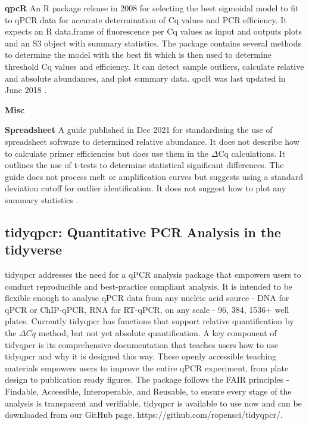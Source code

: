 \documentclass{SBCbookchapter}
\begin{document}
\textbf{qpcR} An R package release in 2008 for selecting the best sigmoidal model to fit to qPCR data for accurate determination of Cq values and PCR efficiency. It expects an R data.frame of fluorescence per Cq values as input and outputs plots and an S3 object with summary statistics. The package contains several methods to determine the model with the best fit which is then used to determine threshold Cq values and efficiency. It can detect sample outliers, calculate relative and absolute abundances, and plot summary data. qpcR was last updated in June 2018 \cite{Ritz2008}.

\textbf{Misc}

\textbf{Spreadsheet} A guide published in Dec 2021 for standardising the use of spreadsheet software to determined relative abundance. It does not describe how to calculate primer efficiencies but does use them in the $\Delta$Cq calculations. It outlines the use of t-tests to determine statistical significant differences.  The guide does not process melt or amplification curves but suggests using a standard deviation cutoff for outlier identification. It does not suggest how to plot any summary statistics \cite{Ng2021}.



\subsection{tidyqpcr: Quantitative PCR Analysis in the tidyverse}

tidyqpcr addresses the need for a qPCR analysis package that empowers users to conduct reproducible and best-practice compliant analysis.
It is intended to be flexible enough to analyse qPCR data from any nucleic acid source - DNA for qPCR or ChIP-qPCR, RNA for RT-qPCR, on any scale - 96, 384, 1536+ well plates.
Currently tidyqpcr has functions that support relative quantification by the $\Delta Cq$ method, but not yet absolute quantification.
A key component of tidyqpcr is its comprehensive documentation that teaches users how to use tidyqpcr and why it is designed this way.
These openly accessible teaching materials empowers users to improve the entire qPCR experiment, from plate design to publication ready figures.
The package follows the FAIR principles - Findable, Accessible, Interoperable, and Reusable, to ensure every stage of the analysis is transparent and verifiable. 
tidyqpcr is available to use now and can be downloaded from our GitHub page, https://github.com/ropensci/tidyqpcr/.
\end{document}
